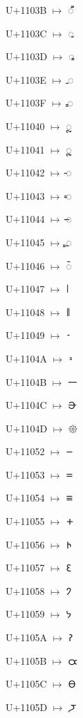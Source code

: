 {\noindent U+1103B $\mapsto$ {\brfont 𑀻}\par
\noindent U+1103C $\mapsto$ {\brfont 𑀼}\par
\noindent U+1103D $\mapsto$ {\brfont 𑀽}\par
\noindent U+1103E $\mapsto$ {\brfont 𑀾}\par
\noindent U+1103F $\mapsto$ {\brfont 𑀿}\par
\noindent U+11040 $\mapsto$ {\brfont 𑁀}\par
\noindent U+11041 $\mapsto$ {\brfont 𑁁}\par
\noindent U+11042 $\mapsto$ {\brfont 𑁂}\par
\noindent U+11043 $\mapsto$ {\brfont 𑁃}\par
\noindent U+11044 $\mapsto$ {\brfont 𑁄}\par
\noindent U+11045 $\mapsto$ {\brfont 𑁅}\par
\noindent U+11046 $\mapsto$ {\brfont 𑁆}\par
\noindent U+11047 $\mapsto$ {\brfont 𑁇}\par
\noindent U+11048 $\mapsto$ {\brfont 𑁈}\par
\noindent U+11049 $\mapsto$ {\brfont 𑁉}\par
\noindent U+1104A $\mapsto$ {\brfont 𑁊}\par
\noindent U+1104B $\mapsto$ {\brfont 𑁋}\par
\noindent U+1104C $\mapsto$ {\brfont 𑁌}\par
\noindent U+1104D $\mapsto$ {\brfont 𑁍}\par
\noindent U+11052 $\mapsto$ {\brfont 𑁒}\par
\noindent U+11053 $\mapsto$ {\brfont 𑁓}\par
\noindent U+11054 $\mapsto$ {\brfont 𑁔}\par
\noindent U+11055 $\mapsto$ {\brfont 𑁕}\par
\noindent U+11056 $\mapsto$ {\brfont 𑁖}\par
\noindent U+11057 $\mapsto$ {\brfont 𑁗}\par
\noindent U+11058 $\mapsto$ {\brfont 𑁘}\par
\noindent U+11059 $\mapsto$ {\brfont 𑁙}\par
\noindent U+1105A $\mapsto$ {\brfont 𑁚}\par
\noindent U+1105B $\mapsto$ {\brfont 𑁛}\par
\noindent U+1105C $\mapsto$ {\brfont 𑁜}\par
\noindent U+1105D $\mapsto$ {\brfont 𑁝}\par
}

